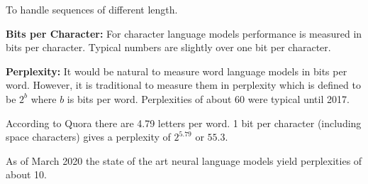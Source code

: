 {To handle sequences of different length.



{\bf Bits per Character:}
For character language models performance is measured in bits per character.  Typical numbers are slightly over one bit per character.

\vfill
{\bf Perplexity:}
It would be natural to measure word language models in bits per word.  However, it is traditional to measure them in perplexity which is defined to be
$2^b$ where $b$ is bits per word.  Perplexities of about 60 were typical until 2017.


\vfill
According to Quora there are 4.79 letters per word.  1 bit per character (including space characters) gives a perplexity of $2^{5.79}$ or $55.3$.


As of March 2020 the state of the art neural language models
yield perplexities of about 10.


}

